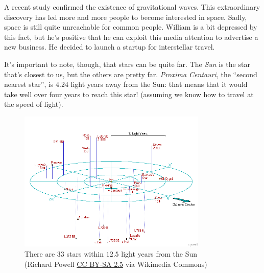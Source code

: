 \usepackage{xcolor}
\usepackage{afterpage}
\usepackage{hyperref}
\usepackage{caption}
\usepackage{pifont,mdframed}
\usepackage[bottom]{footmisc}

\makeatletter
\gdef\this@inputfilename{input.txt}
\gdef\this@outputfilename{output.txt}
\makeatother

\newcommand{\inputfile}{\texttt{input.txt}}
\newcommand{\outputfile}{\texttt{output.txt}}

\newenvironment{warning}
  {\par\begin{mdframed}[linewidth=2pt,linecolor=gray]%
    \begin{list}{}{\leftmargin=1cm
                   \labelwidth=\leftmargin}\item[\Large\ding{43}]}
  {\end{list}\end{mdframed}\par}

  A recent study confirmed the existence of gravitational waves. This extraordinary discovery has led more and more people to become interested in space. Sadly, space is still quite unreachable for common people. William is a bit depressed by this fact, but he's positive that he can exploit this media attention to advertise a new business. He decided to launch a startup for interstellar travel.

  It's important to note, though, that stars can be quite far. The \emph{Sun} is the star that's closest to us, but the others are pretty far. \emph{Proxima Centauri}, the ``second nearest star'', is $4.24$ light years away from the Sun: that means that it would take well over four years to reach this star! (assuming we know how to travel at the speed of light).

  \begin{figure}[h]
    \centering
    \includegraphics[width=0.8\textwidth]{12ly.png}
    \caption*{There are $33$ stars within $12.5$ light years from the Sun \\ \scriptsize (Richard Powell \href{http://creativecommons.org/licenses/by-sa/2.5}{CC BY-SA 2.5} via Wikimedia Commons)}
  \end{figure}

